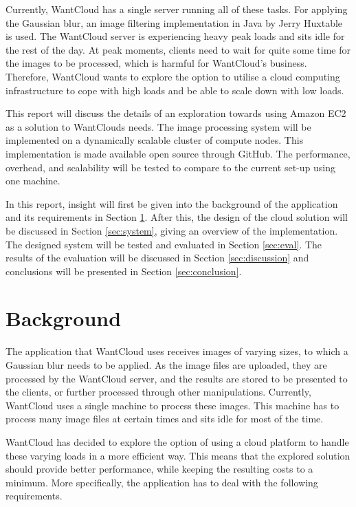 \documentclass{acm_proc_article-sp}
\begin{document}
Currently, WantCloud has a single server running all of these tasks.
For applying the Gaussian blur, an image filtering implementation in Java by Jerry Huxtable is used.\cite{web:huxtable}
The WantCloud server is experiencing heavy peak loads and sits idle for the rest of the day.
At peak moments, clients need to wait for quite some time for the images to be processed, which is harmful for WantCloud's business.
Therefore, WantCloud wants to explore the option to utilise a cloud computing infrastructure to cope with high loads and be able to scale down with low loads.

This report will discuss the details of an exploration towards using Amazon EC2\cite{web:ec2} as a solution to WantClouds needs.
The image processing system will be implemented on a dynamically scalable cluster of compute nodes.
This implementation is made available open source through GitHub\cite{web:git}.
The performance, overhead, and scalability will be tested to compare to the current set-up using one machine.

In this report, insight will first be given into the background of the application and its requirements in Section \ref{sec:bg}.
After this, the design of the cloud solution will be discussed in Section \ref{sec:system}, giving an overview of the implementation.
The designed system will be tested and evaluated in Section \ref{sec:eval}.
The results of the evaluation will be discussed in Section \ref{sec:discussion} and conclusions will be presented in Section \ref{sec:conclusion}.

\section{Background}
\label{sec:bg}
The application that WantCloud uses receives images of varying sizes, to which a Gaussian blur needs to be applied.
As the image files are uploaded, they are processed by the WantCloud server, and the results are stored to be presented to the clients, or further processed through other manipulations.
Currently, WantCloud uses a single machine to process these images.
This machine has to process many image files at certain times and sits idle for most of the time.

WantCloud has decided to explore the option of using a cloud platform to handle these varying loads in a more efficient way.
This means that the explored solution should provide better performance, while keeping the resulting costs to a minimum.
More specifically, the application has to deal with the following requirements.
\end{document}
